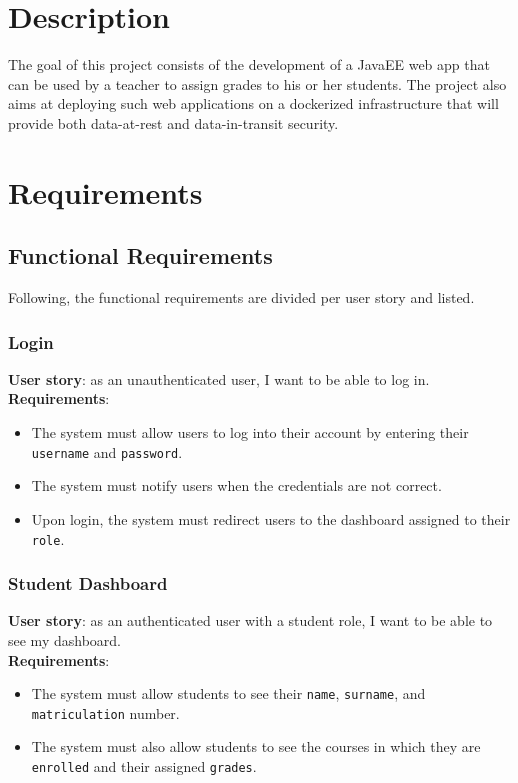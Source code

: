 \chapter{Description}

The goal of this project consists of the development of a JavaEE web app that can be used by a teacher to assign grades to his or her students. The project also aims at deploying such web applications on a dockerized infrastructure that will provide both data-at-rest and data-in-transit security.

\chapter{Requirements}

\section{Functional Requirements}

Following, the functional requirements are divided per user story and listed.

\subsection{Login}

\noindent\textbf{User story}: as an unauthenticated user, I want to be able to log in.\\
\noindent\textbf{Requirements}:
\begin{itemize}
    \item The system must allow users to log into their account by entering their \texttt{username} and \texttt{password}.
    \item The system must notify users when the credentials are not correct.
    \item Upon login, the system must redirect users to the dashboard assigned to their \texttt{role}.
\end{itemize}

\subsection{Student Dashboard}

\noindent\textbf{User story}: as an authenticated user with a student role, I want to be able to see my dashboard.\\
\noindent\textbf{Requirements}:
\begin{itemize}
    \item The system must allow students to see their \texttt{name}, \texttt{surname}, and \texttt{matriculation} number.
    \item The system must also allow students to see the courses in which they are \texttt{enrolled} and their assigned \texttt{grades}.
\end{itemize}

